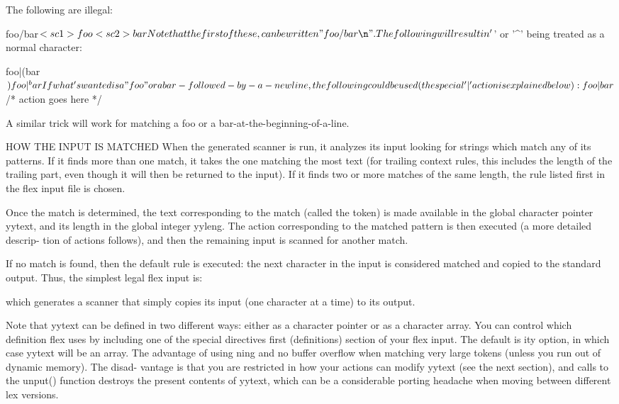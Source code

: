 \documentclass[12pt,spanish,twocolumn,lettersize]{article}
\begin{document}
	      The following are illegal:

		  foo/bar$
		  <sc1>foo<sc2>bar

	      Note that	 the  first  of	 these,	 can  be  written
	      "foo/bar\n".

	      The  following  will  result  in	'$'  or '^' being
	      treated as a normal character:

		  foo|(bar$)
		  foo|^bar

	      If what's wanted is a "foo" or a bar-followed-by-a-
	      newline,	the  following could be used (the special
	      '|' action is explained below):

		  foo	   |
		  bar$	   /* action goes here */

	      A similar trick will work for matching a foo  or	a
	      bar-at-the-beginning-of-a-line.

HOW THE INPUT IS MATCHED
       When  the  generated scanner is run, it analyzes its input
       looking for strings which match any of its  patterns.   If
       it  finds  more	than one match, it takes the one matching
       the most text (for trailing context rules,  this	 includes
       the  length of the trailing part, even though it will then
       be returned to the  input).   If	 it  finds  two	 or  more
       matches	of  the same length, the rule listed first in the
       flex input file is chosen.

       Once the match is determined, the  text	corresponding  to
       the  match  (called  the	 token)	 is made available in the
       global character pointer yytext, and  its  length  in  the
       global  integer	yyleng.	  The action corresponding to the
       matched pattern is then executed (a more detailed descrip-
       tion  of actions follows), and then the remaining input is
       scanned for another match.

       If no match is found, then the default rule  is	executed:
       the  next character in the input is considered matched and
       copied to the standard output.  Thus, the  simplest  legal
       flex input is:


       which  generates	 a  scanner  that simply copies its input
       (one character at a time) to its output.

       Note that yytext can be defined	in  two	 different  ways:
       either  as  a  character	 pointer or as a character array.
       You can control which definition flex  uses  by	including
       one  of	the  special directives %
       first (definitions)  section  of	 your  flex  input.   The
       default is %
       ity option, in which case yytext will be	 an  array.   The
       advantage  of using %
       ning and no  buffer  overflow  when  matching  very  large
       tokens (unless you run out of dynamic memory).  The disad-
       vantage is that you are restricted in how your actions can
       modify  yytext  (see  the  next section), and calls to the
       unput() function destroys the present contents of  yytext,
       which  can  be a considerable porting headache when moving
       between different lex versions.
\end{document}
